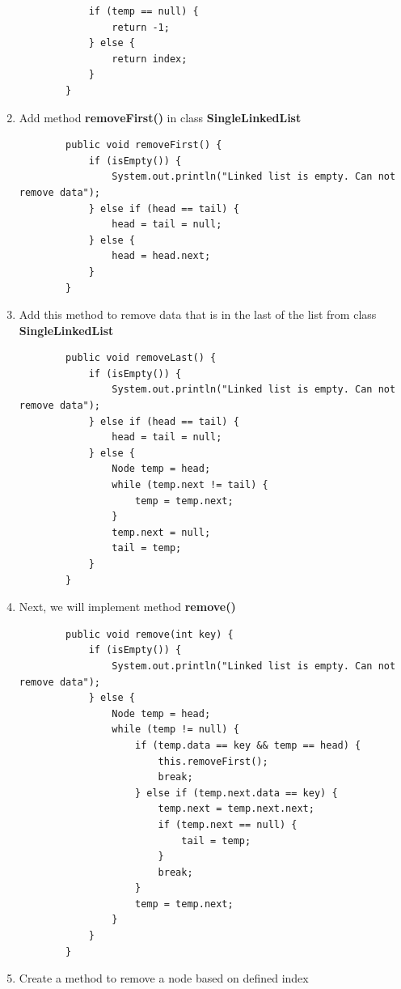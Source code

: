 \documentclass[12pt,titlepage]{article}
\begin{document}
\begin{enumerate}
\begin{verbatim}
            if (temp == null) {
                return -1;
            } else {
                return index;
            }
        }
    \end{verbatim}
    \item Add method \textbf{removeFirst()} in class \textbf{SingleLinkedList}
    \begin{verbatim}
        public void removeFirst() {
            if (isEmpty()) {
                System.out.println("Linked list is empty. Can not remove data");
            } else if (head == tail) {
                head = tail = null;
            } else {
                head = head.next;
            }
        }
    \end{verbatim}
    \item Add this method to remove data that is in the last of the list from class \textbf{SingleLinkedList}
    \begin{verbatim}
        public void removeLast() {
            if (isEmpty()) {
                System.out.println("Linked list is empty. Can not remove data");
            } else if (head == tail) {
                head = tail = null;
            } else {
                Node temp = head;
                while (temp.next != tail) {
                    temp = temp.next;
                }
                temp.next = null;
                tail = temp;
            }
        }
    \end{verbatim}
    \item Next, we will implement method \textbf{remove()}
    \begin{verbatim}
        public void remove(int key) {
            if (isEmpty()) {
                System.out.println("Linked list is empty. Can not remove data");
            } else {
                Node temp = head;
                while (temp != null) {
                    if (temp.data == key && temp == head) {
                        this.removeFirst();
                        break;
                    } else if (temp.next.data == key) {
                        temp.next = temp.next.next;
                        if (temp.next == null) {
                            tail = temp;
                        }
                        break;
                    }
                    temp = temp.next;
                }
            }
        }
    \end{verbatim}
    \item Create a method to remove a node based on defined index
    \begin{verbatim}

\end{verbatim}
\end{enumerate}
\end{document}
